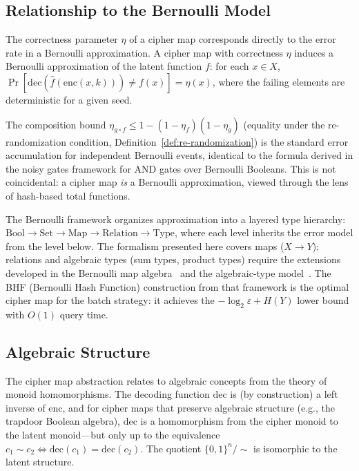 \documentclass[11pt]{article}
\theoremstyle{definition}
\theoremstyle{plain}
\theoremstyle{remark}
\newcommand{\fhat}{\hat{f}}
\newcommand{\enc}{\mathrm{enc}}
\newcommand{\dec}{\mathrm{dec}}
\begin{document}
\subsection{Relationship to the Bernoulli Model}

The correctness parameter $\eta$ of a cipher map corresponds directly to the
error rate in a Bernoulli approximation.  A cipher map with correctness
$\eta$ induces a Bernoulli approximation of the latent function $f$: for
each $x \in X$,
$\Pr[\dec(\fhat(\enc(x,k))) \neq f(x)] = \eta(x)$,
where the failing elements are deterministic for a given seed.

The composition bound
$\eta_{g \circ f} \leq 1 - (1-\eta_f)(1-\eta_g)$
(equality under the re-randomization condition,
Definition~\ref{def:re-randomization})
is the standard error accumulation for independent Bernoulli events,
identical to the formula derived in the noisy gates framework for AND gates
over Bernoulli Booleans.  This is not coincidental: a cipher map \emph{is} a
Bernoulli approximation, viewed through the lens of hash-based total
functions.

The Bernoulli framework organizes approximation into a layered type hierarchy:
$\mathrm{Bool} \to \mathrm{Set} \to \mathrm{Map} \to \mathrm{Relation} \to
\mathrm{Type}$, where each level inherits the error model from the level
below.  The formalism presented here covers maps ($X \to Y$); relations and
algebraic types (sum types, product types) require the extensions developed in
the Bernoulli map algebra~\cite{bernoulli2026maps} and the algebraic-type
model~\cite{bernoulli2026datatype}.
The BHF (Bernoulli Hash Function) construction from that framework is the
optimal cipher map for the batch strategy: it achieves the
$-\log_2 \varepsilon + H(Y)$ lower bound with $O(1)$ query time.

\subsection{Algebraic Structure}

The cipher map abstraction relates to algebraic concepts from the theory of
monoid homomorphisms.  The decoding function $\dec$ is (by construction) a
left inverse of $\enc$, and for cipher maps that preserve algebraic
structure (e.g., the trapdoor Boolean algebra), $\dec$ is a homomorphism
from the cipher monoid to the latent monoid---but only up to the
equivalence $c_1 \sim c_2 \iff \dec(c_1) = \dec(c_2)$.  The quotient
$\{0,1\}^n / {\sim}$ is isomorphic to the latent structure.
\end{document}
